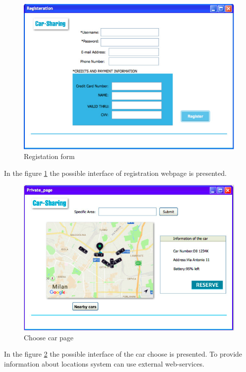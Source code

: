\documentclass[12pt, letterpaper]{article}
\begin{document}
\begin{figure}[H]
\centering
\includegraphics[width=12cm]{register.jpg}
\caption{Registation form}
\label{fig:Reg}
\end{figure}

In the figure \ref{fig:Reg} the possible interface of registration webpage is presented. \\

\begin{figure}[H]
\centering
\includegraphics[width=12cm]{Choosecar.png}
\caption{Choose car page}
\label{fig:Choose}
\end{figure}

In the figure \ref{fig:Choose} the possible interface of the car choose is presented. To provide information about locations system can use external web-services. 
\end{document}
